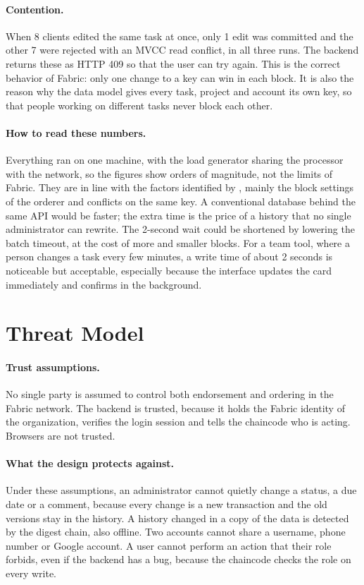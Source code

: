 \paragraph*{Contention.} When 8 clients edited the same task at once, only 1 edit was committed and the other 7 were rejected with an MVCC read conflict, in all three runs. The backend returns these as HTTP 409 so that the user can try again. This is the correct behavior of Fabric: only one change to a key can win in each block. It is also the reason why the data model gives every task, project and account its own key, so that people working on different tasks never block each other.

\paragraph*{How to read these numbers.} Everything ran on one machine, with the load generator sharing the processor with the network, so the figures show orders of magnitude, not the limits of Fabric. They are in line with the factors identified by \textcite{thakkar2018performance}, mainly the block settings of the orderer and conflicts on the same key. A conventional database behind the same API would be faster; the extra time is the price of a history that no single administrator can rewrite. The 2-second wait could be shortened by lowering the batch timeout, at the cost of more and smaller blocks. For a team tool, where a person changes a task every few minutes, a write time of about 2 seconds is noticeable but acceptable, especially because the interface updates the card immediately and confirms in the background.



\section{Threat Model}
\label{sec:results-threats}

\paragraph*{Trust assumptions.} No single party is assumed to control both endorsement and ordering in the Fabric network. The backend is trusted, because it holds the Fabric identity of the organization, verifies the login session and tells the chaincode who is acting. Browsers are not trusted.

\paragraph*{What the design protects against.} Under these assumptions, an administrator cannot quietly change a status, a due date or a comment, because every change is a new transaction and the old versions stay in the history. A history changed in a copy of the data is detected by the digest chain, also offline. Two accounts cannot share a username, phone number or Google account. A user cannot perform an action that their role forbids, even if the backend has a bug, because the chaincode checks the role on every write.

